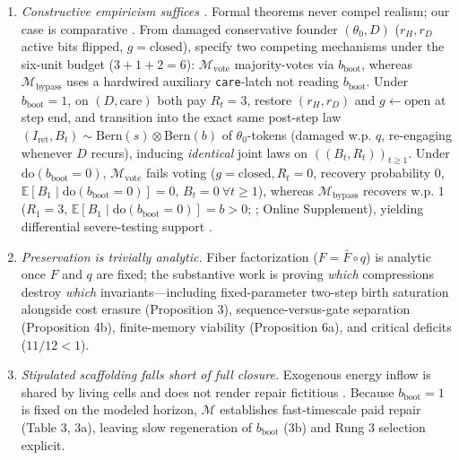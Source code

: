 \documentclass[11pt,letterpaper]{article}
\providecommand{\tightlist}{\setlength{\itemsep}{2pt}\setlength{\parskip}{0pt}}
\begin{document}
\begin{enumerate}
\def\labelenumi{\arabic{enumi}.}
\tightlist
\item
  \emph{Constructive empiricism suffices \citep{vanFraassen1980}.}
  Formal theorems never compel realism; our case is comparative
  \citep{hacking1983, woodward2003}. From damaged conservative founder
  \((\theta_0, D)\) (\(r_H, r_D\) active bits flipped,
  \(g=\mathrm{closed}\)), specify two competing mechanisms under the
  six-unit budget (\(3+1+2=6\)): \(\mathcal{M}_{\mathrm{vote}}\)
  majority-votes via \(b_{\mathrm{boot}}\), whereas
  \(\mathcal{M}_{\mathrm{bypass}}\) uses a hardwired auxiliary
  \texttt{care}-latch not reading \(b_{\mathrm{boot}}\). Under
  \(b_{\mathrm{boot}}=1\), on \((D,\mathrm{care})\) both pay \(R_t=3\),
  restore \((r_H,r_D)\) and \(g \leftarrow \mathrm{open}\) at step end,
  and transition into the exact same post-step law
  \((I_{\mathrm{ret}}, B_t) \sim \mathrm{Bern}(s)\otimes\mathrm{Bern}(b)\)
  of \(\theta_0\)-tokens (damaged w.p. \(q\), re-engaging whenever \(D\)
  recurs), inducing \emph{identical} joint laws on
  \(((B_t,R_t))_{t\ge 1}\). Under \(\mathrm{do}(b_{\mathrm{boot}}=0)\),
  \(\mathcal{M}_{\mathrm{vote}}\) fails voting
  (\(g=\mathrm{closed}, R_t=0\), recovery probability \(0\),
  \(\mathbb{E}[B_1\mid \mathrm{do}(b_{\mathrm{boot}}=0)]=0\),
  \(B_t=0\ \forall t\ge 1\)), whereas \(\mathcal{M}_{\mathrm{bypass}}\)
  recovers w.p. \(1\) (\(R_1=3\),
  \(\mathbb{E}[B_1\mid \mathrm{do}(b_{\mathrm{boot}}=0)]=b>0\);
  \citet{rubenstein2017}; Online Supplement), yielding differential
  severe-testing support \citep{mayo2018}.
\item
  \emph{Preservation is trivially analytic.} Fiber factorization
  (\(F = \bar{F}\circ q\)) is analytic once \(F\) and \(q\) are fixed;
  the substantive work is proving \emph{which} compressions destroy
  \emph{which} invariants---including fixed-parameter two-step birth
  saturation alongside cost erasure (Proposition 3),
  sequence-versus-gate separation (Proposition 4b), finite-memory
  viability (Proposition 6a), and critical deficits (\(11/12 < 1\)).
\item
  \emph{Stipulated scaffolding falls short of full closure.} Exogenous
  energy inflow is shared by living cells and does not render repair
  fictitious \citep{jonas1966, montevilMossio2015}. Because
  \(b_{\mathrm{boot}}=1\) is fixed on the modeled horizon,
  \(\mathcal{M}\) establishes fast-timescale paid repair (Table 3, 3a),
  leaving slow regeneration of \(b_{\mathrm{boot}}\) (3b) and Rung 3
  selection explicit.

\end{enumerate}
\end{document}
